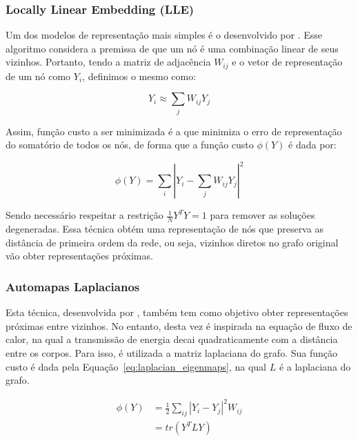 \subsubsection{Locally Linear Embedding (LLE)}

Um dos modelos de representação mais simples é o desenvolvido por \citet{roweis00}.
Esse algoritmo considera a premissa de que um nó é uma combinação linear de
seus vizinhos.
Portanto, tendo a matriz de adjacência $W_{ij}$ e o vetor de representação de um
nó como $Y_i$, definimos o mesmo como:

\begin{equation}
    Y_i \approx \sum_j{W_{ij}Y_j}
\end{equation}

Assim, função custo a ser minimizada é a que minimiza o erro de representação
do somatório de todos os nós, de forma que a função custo $\phi(Y)$
é dada por:

\begin{equation}
    \phi(Y) = \sum_i{|Y_i - \sum_j{W_{ij}Y_j}|^2}
\end{equation}

Sendo necessário respeitar a restrição $\frac{1}{N}Y^TY = 1$ para remover as
soluções degeneradas.
Essa técnica obtém uma representação de nós que preserva as distância de
primeira ordem da rede, ou seja, vizinhos diretos no grafo original vão obter
representações próximas.

\subsubsection{Automapas Laplacianos}

Esta técnica, desenvolvida por \citet{belkin02}, também tem como objetivo obter
representações próximas entre vizinhos.
No entanto, desta vez é inspirada na equação de fluxo de calor, na qual a transmissão de
energia decai quadraticamente com a distância entre os corpos.
Para isso, é utilizada a matriz laplaciana do grafo.
Sua função custo é dada pela Equação~\ref{eq:laplacian_eigenmaps}, na qual $L$ é
a laplaciana do grafo.

\begin{equation} \label{eq:laplacian_eigenmaps}
\begin{aligned}
    \phi(Y) &= \frac{1}{2} \sum_{ij}{|Y_i - Y_j|^2 W_{ij}} \\
            &= tr(Y^TLY)
\end{aligned}
\end{equation}

